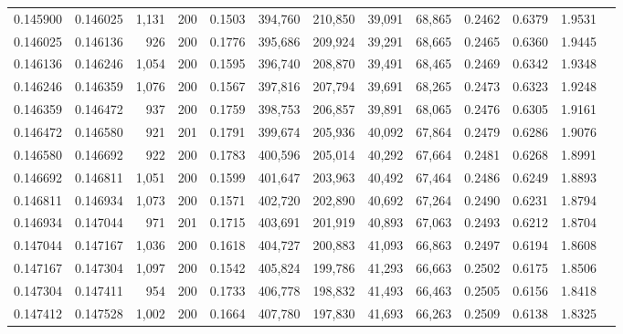 \begin{tabular}{rrrrrrrrrrrrr}
0.145900 & 0.146025 &  1,131 & 200 &                                     0.1503 & 394,760 & 210,850 &  39,091 &  68,865 & 0.2462 & 0.6379 & 1.9531 \\
0.146025 & 0.146136 &    926 & 200 &                                     0.1776 & 395,686 & 209,924 &  39,291 &  68,665 & 0.2465 & 0.6360 & 1.9445 \\
0.146136 & 0.146246 &  1,054 & 200 &                                     0.1595 & 396,740 & 208,870 &  39,491 &  68,465 & 0.2469 & 0.6342 & 1.9348 \\
0.146246 & 0.146359 &  1,076 & 200 &                                     0.1567 & 397,816 & 207,794 &  39,691 &  68,265 & 0.2473 & 0.6323 & 1.9248 \\
0.146359 & 0.146472 &    937 & 200 &                                     0.1759 & 398,753 & 206,857 &  39,891 &  68,065 & 0.2476 & 0.6305 & 1.9161 \\
0.146472 & 0.146580 &    921 & 201 &                                     0.1791 & 399,674 & 205,936 &  40,092 &  67,864 & 0.2479 & 0.6286 & 1.9076 \\
0.146580 & 0.146692 &    922 & 200 &                                     0.1783 & 400,596 & 205,014 &  40,292 &  67,664 & 0.2481 & 0.6268 & 1.8991 \\
0.146692 & 0.146811 &  1,051 & 200 &                                     0.1599 & 401,647 & 203,963 &  40,492 &  67,464 & 0.2486 & 0.6249 & 1.8893 \\
0.146811 & 0.146934 &  1,073 & 200 &                                     0.1571 & 402,720 & 202,890 &  40,692 &  67,264 & 0.2490 & 0.6231 & 1.8794 \\
0.146934 & 0.147044 &    971 & 201 &                                     0.1715 & 403,691 & 201,919 &  40,893 &  67,063 & 0.2493 & 0.6212 & 1.8704 \\
0.147044 & 0.147167 &  1,036 & 200 &                                     0.1618 & 404,727 & 200,883 &  41,093 &  66,863 & 0.2497 & 0.6194 & 1.8608 \\
0.147167 & 0.147304 &  1,097 & 200 &                                     0.1542 & 405,824 & 199,786 &  41,293 &  66,663 & 0.2502 & 0.6175 & 1.8506 \\
0.147304 & 0.147411 &    954 & 200 &                                     0.1733 & 406,778 & 198,832 &  41,493 &  66,463 & 0.2505 & 0.6156 & 1.8418 \\
0.147412 & 0.147528 &  1,002 & 200 &                                     0.1664 & 407,780 & 197,830 &  41,693 &  66,263 & 0.2509 & 0.6138 & 1.8325 \\

\end{tabular}
